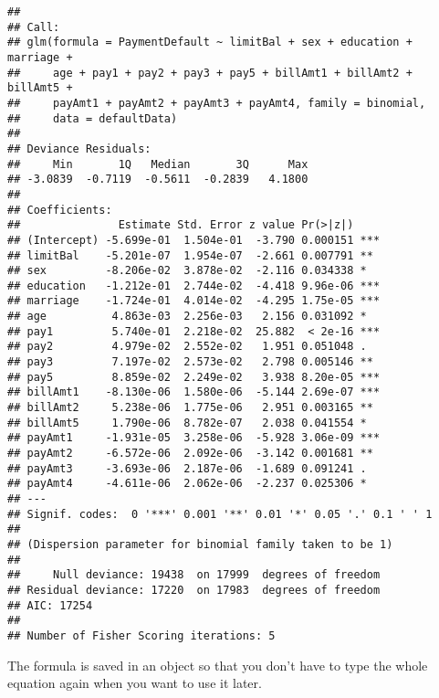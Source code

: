 \documentclass[
]{article}
\newenvironment{Shaded}{\begin{snugshade}}{\end{snugshade}}
\newcommand{\CommentTok}[1]{\textcolor[rgb]{0.56,0.35,0.01}{\textit{#1}}}
\newcommand{\KeywordTok}[1]{\textcolor[rgb]{0.13,0.29,0.53}{\textbf{#1}}}
\newcommand{\NormalTok}[1]{#1}
\newcommand{\OperatorTok}[1]{\textcolor[rgb]{0.81,0.36,0.00}{\textbf{#1}}}
\newcommand{\StringTok}[1]{\textcolor[rgb]{0.31,0.60,0.02}{#1}}
\begin{document}
\begin{verbatim}
## 
## Call:
## glm(formula = PaymentDefault ~ limitBal + sex + education + marriage + 
##     age + pay1 + pay2 + pay3 + pay5 + billAmt1 + billAmt2 + billAmt5 + 
##     payAmt1 + payAmt2 + payAmt3 + payAmt4, family = binomial, 
##     data = defaultData)
## 
## Deviance Residuals: 
##     Min       1Q   Median       3Q      Max  
## -3.0839  -0.7119  -0.5611  -0.2839   4.1800  
## 
## Coefficients:
##               Estimate Std. Error z value Pr(>|z|)    
## (Intercept) -5.699e-01  1.504e-01  -3.790 0.000151 ***
## limitBal    -5.201e-07  1.954e-07  -2.661 0.007791 ** 
## sex         -8.206e-02  3.878e-02  -2.116 0.034338 *  
## education   -1.212e-01  2.744e-02  -4.418 9.96e-06 ***
## marriage    -1.724e-01  4.014e-02  -4.295 1.75e-05 ***
## age          4.863e-03  2.256e-03   2.156 0.031092 *  
## pay1         5.740e-01  2.218e-02  25.882  < 2e-16 ***
## pay2         4.979e-02  2.552e-02   1.951 0.051048 .  
## pay3         7.197e-02  2.573e-02   2.798 0.005146 ** 
## pay5         8.859e-02  2.249e-02   3.938 8.20e-05 ***
## billAmt1    -8.130e-06  1.580e-06  -5.144 2.69e-07 ***
## billAmt2     5.238e-06  1.775e-06   2.951 0.003165 ** 
## billAmt5     1.790e-06  8.782e-07   2.038 0.041554 *  
## payAmt1     -1.931e-05  3.258e-06  -5.928 3.06e-09 ***
## payAmt2     -6.572e-06  2.092e-06  -3.142 0.001681 ** 
## payAmt3     -3.693e-06  2.187e-06  -1.689 0.091241 .  
## payAmt4     -4.611e-06  2.062e-06  -2.237 0.025306 *  
## ---
## Signif. codes:  0 '***' 0.001 '**' 0.01 '*' 0.05 '.' 0.1 ' ' 1
## 
## (Dispersion parameter for binomial family taken to be 1)
## 
##     Null deviance: 19438  on 17999  degrees of freedom
## Residual deviance: 17220  on 17983  degrees of freedom
## AIC: 17254
## 
## Number of Fisher Scoring iterations: 5
\end{verbatim}

The formula is saved in an object so that you don't have to type the
whole equation again when you want to use it later.

\begin{Shaded}
\end{Shaded}
\end{document}
